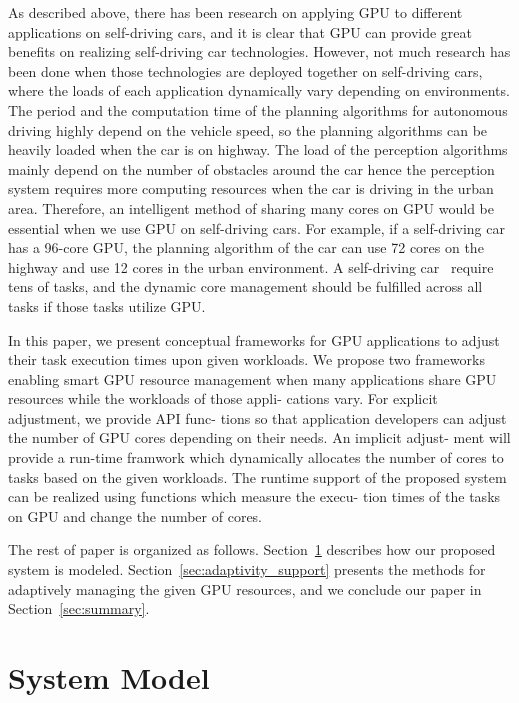 \documentclass[times, 10pt, twocolumn]{article}
\begin{document}
As described above, there has been research on applying GPU to different applications on self-driving cars, and it is clear that GPU can provide great benefits on realizing self-driving car technologies. However, not much research has been done when those technologies are deployed together on self-driving cars, where the loads of each application dynamically vary depending on environments. The period and the computation time of the planning algorithms for autonomous driving highly depend on the vehicle speed, so the planning algorithms can be heavily loaded when the car is on highway. The load of the perception algorithms mainly depend on the number of obstacles around the car hence the perception system requires more computing resources when the car is driving in the urban area. Therefore, an intelligent method of sharing many cores on GPU would be essential when we use GPU on self-driving cars. For example, if a self-driving car has a 96-core GPU, the planning algorithm of the car can use 72 cores on the highway and use 12 cores in the urban environment. A self-driving car~\cite{Urmson08} require tens of tasks, and the dynamic core management should be fulfilled across all tasks if those tasks utilize GPU. 

In this paper, we present conceptual frameworks for
GPU applications to adjust their task execution times upon
given workloads. We propose two frameworks enabling
smart GPU resource management when many applications
share GPU resources while the workloads of those appli-
cations vary. For explicit adjustment, we provide API func-
tions so that application developers can adjust the number
of GPU cores depending on their needs. An implicit adjust-
ment will provide a run-time framwork which dynamically
allocates the number of cores to tasks based on the given
workloads. The runtime support of the proposed system
can be realized using functions which measure the execu-
tion times of the tasks on GPU and change the number of
cores.


The rest of paper is organized as follows. Section~\ref{sec:system_model} describes how our proposed system is modeled. Section~\ref{sec:adaptivity_support} presents the methods for adaptively managing the given GPU resources, and we conclude our paper in Section~\ref{sec:summary}.

\section{System Model}
\label{sec:system_model}
\end{document}
